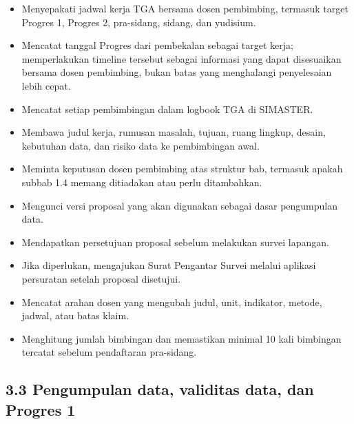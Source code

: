 \documentclass[
  indonesian,
  11pt,
]{article}
\providecommand{\tightlist}{%
  \setlength{\itemsep}{0pt}\setlength{\parskip}{0pt}}
\renewcommand{\tightlist}{%
  \setlength{\itemsep}{0.22em}%
  \setlength{\parskip}{0pt}%
}
\begin{document}
\begin{itemize}
\tightlist
\item[$\square$]
  Menyepakati jadwal kerja TGA bersama dosen pembimbing, termasuk target
  Progres 1, Progres 2, pra-sidang, sidang, dan yudisium.
\item[$\square$]
  Mencatat tanggal Progres dari pembekalan sebagai target kerja;
  memperlakukan timeline tersebut sebagai informasi yang dapat
  disesuaikan bersama dosen pembimbing, bukan batas yang menghalangi
  penyelesaian lebih cepat.
\item[$\square$]
  Mencatat setiap pembimbingan dalam logbook TGA di SIMASTER.
\item[$\square$]
  Membawa judul kerja, rumusan masalah, tujuan, ruang lingkup, desain,
  kebutuhan data, dan risiko data ke pembimbingan awal.
\item[$\square$]
  Meminta keputusan dosen pembimbing atas struktur bab, termasuk apakah
  subbab 1.4 memang ditiadakan atau perlu ditambahkan.
\item[$\square$]
  Mengunci versi proposal yang akan digunakan sebagai dasar pengumpulan
  data.
\item[$\square$]
  Mendapatkan persetujuan proposal sebelum melakukan survei lapangan.
\item[$\square$]
  Jika diperlukan, mengajukan Surat Pengantar Survei melalui aplikasi
  persuratan setelah proposal disetujui.
\item[$\square$]
  Mencatat arahan dosen yang mengubah judul, unit, indikator, metode,
  jadwal, atau batas klaim.
\item[$\square$]
  Menghitung jumlah bimbingan dan memastikan minimal 10 kali bimbingan
  tercatat sebelum pendaftaran pra-sidang.
\end{itemize}

\subsection{3.3 Pengumpulan data, validitas data, dan Progres
1}\label{pengumpulan-data-validitas-data-dan-progres-1}
\end{document}
